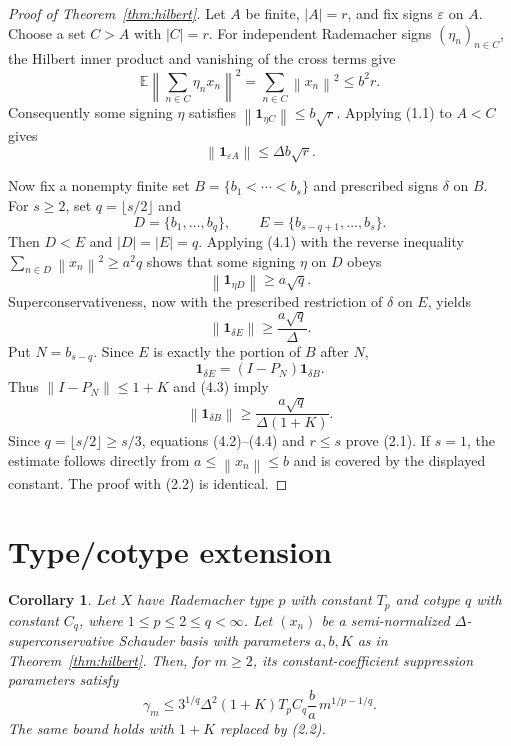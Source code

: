 \documentclass[11pt]{article}
\newtheorem{corollary}[theorem]{Corollary}
\newcommand{\norm}[1]{\left\lVert #1\right\rVert}
\newcommand{\one}[2]{\mathbf 1_{#1 #2}}
\begin{document}
\begin{proof}[Proof of Theorem~\ref{thm:hilbert}]
Let $A$ be finite, $|A|=r$, and fix signs $\varepsilon$ on $A$.  Choose a set
$C>A$ with $|C|=r$.  For independent Rademacher signs $(\eta_n)_{n\in C}$,
the Hilbert inner product and vanishing of the cross terms give
\[
 \mathbb E\norm{\sum_{n\in C}\eta_nx_n}^2
 =\sum_{n\in C}\norm{x_n}^2\le b^2r.                   \tag{4.1}
\]
Consequently some signing $\eta$ satisfies
$\norm{\one{\eta}{C}}\le b\sqrt r$.  Applying (1.1) to $A<C$ gives
\[
 \norm{\one{\varepsilon}{A}}\le\Delta b\sqrt r.        \tag{4.2}
\]

Now fix a nonempty finite set
$B=\{b_1<\cdots<b_s\}$ and prescribed signs $\delta$ on $B$.
For $s\ge2$, set $q=\lfloor s/2\rfloor$ and
\[
 D=\{b_1,\ldots,b_q\},\qquad
 E=\{b_{s-q+1},\ldots,b_s\}.
\]
Then $D<E$ and $|D|=|E|=q$.  Applying (4.1) with the reverse inequality
$\sum_{n\in D}\norm{x_n}^2\ge a^2q$ shows that some signing $\eta$ on
$D$ obeys
\[
 \norm{\one{\eta}{D}}\ge a\sqrt q.
\]
Superconservativeness, now with the prescribed restriction of $\delta$ on
$E$, yields
\[
 \norm{\one{\delta}{E}}\ge\frac{a\sqrt q}{\Delta}.      \tag{4.3}
\]
Put $N=b_{s-q}$.  Since $E$ is exactly the portion of $B$ after $N$,
\[
 \one{\delta}{E}=(I-P_N)\one{\delta}{B}.
\]
Thus $\norm{I-P_N}\le1+K$ and (4.3) imply
\[
 \norm{\one{\delta}{B}}
 \ge\frac{a\sqrt q}{\Delta(1+K)}.                       \tag{4.4}
\]
Since $q=\lfloor s/2\rfloor\ge s/3$, equations (4.2)--(4.4) and
$r\le s$ prove (2.1).  If $s=1$, the estimate follows directly from
$a\le\norm{x_n}\le b$ and is covered by the displayed constant.
The proof with (2.2) is identical.
\end{proof}

\section{Type/cotype extension}

\begin{corollary}\label{cor:typecotype}
Let $X$ have Rademacher type $p$ with constant $T_p$ and cotype $q$ with
constant $C_q$, where $1\le p\le2\le q<\infty$.  Let $(x_n)$ be a
semi-normalized $\Delta$-superconservative Schauder basis with parameters
$a,b,K$ as in Theorem~\ref{thm:hilbert}.  Then, for $m\ge2$, its
constant-coefficient suppression parameters satisfy
\[
 \gamma_m\le
 3^{1/q}\Delta^2(1+K)T_pC_q\frac ba\,
 m^{1/p-1/q}.                                             \tag{5.1}
\]
The same bound holds with $1+K$ replaced by (2.2).
\end{corollary}
\end{document}
